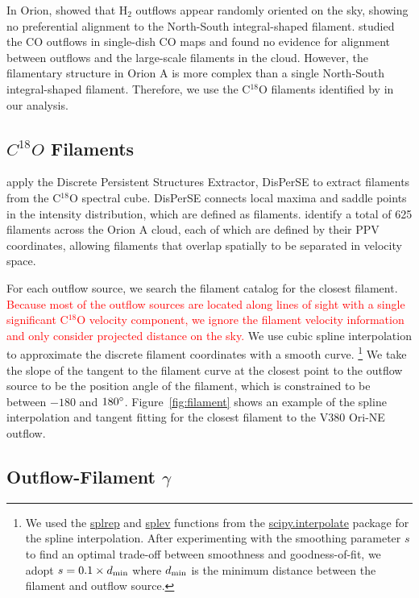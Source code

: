 \documentclass[twocolumn]{aastex62}
\newcommand{\example}{V380 Ori-NE}
\begin{document}
In Orion, \citet{Davis09} showed that H$_{2}$ outflows appear randomly oriented on the sky, showing no preferential alignment to the North-South integral-shaped filament. \citet{Tanabe:submitted} studied the CO outflows in single-dish CO maps and found no evidence for alignment between outflows and the large-scale filaments in the cloud. However, the filamentary structure in Orion A is more complex than a single North-South integral-shaped filament. Therefore, we use the C$^{18}$O filaments identified by \citet{Suri19} in our analysis.

\subsection{$C^{18}O$ Filaments}
\citet{Suri19} apply the Discrete Persistent Structures Extractor, DisPerSE \citep{Sousbie11} to extract filaments from the C$^{18}$O spectral cube. DisPerSE connects local maxima and saddle points in the intensity distribution, which are defined as filaments. \citet{Suri19} identify a total of 625 filaments across the Orion A cloud, each of which are defined by their PPV coordinates, allowing filaments that overlap spatially to be separated in velocity space. 

For each outflow source, we search the filament catalog for the closest filament. \textcolor{red}{Because most of the outflow sources are located along lines of sight with a single significant C$^{18}$O velocity component, we ignore the filament velocity information and only consider projected distance on the sky.} We use cubic spline interpolation to approximate the discrete filament coordinates with a smooth curve. \footnote{We used the \url{splrep} and \url{splev} functions from the \url{scipy.interpolate} package for the spline interpolation. After experimenting with the smoothing parameter $s$ to find an optimal trade-off between smoothness and goodness-of-fit, we adopt $s = 0.1\times d_{\rm min}$ where $d_{\rm min}$ is the minimum distance between the filament and outflow source.} We take the slope of the tangent to the filament curve at the closest point to the outflow source to be the position angle of the filament, which is constrained to be between $-180$ and $180\mbox{$^\circ$}$. Figure~\ref{fig:filament} shows an example of the spline interpolation and tangent fitting for the closest filament to the \example{} outflow.

\subsection{Outflow-Filament $\gamma$}
\end{document}
